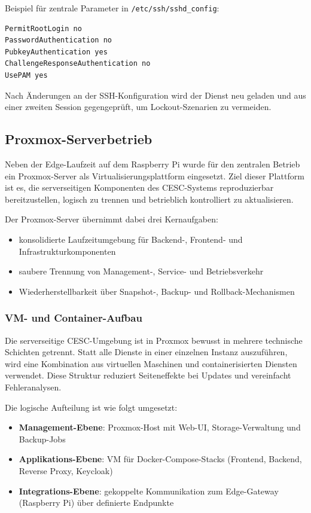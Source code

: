Beispiel für zentrale Parameter in \texttt{/etc/ssh/sshd\_config}:

\begin{lstlisting}[language=bash,caption={Typische SSH-Hardening-Parameter},label={lst:ssh_hardening},basicstyle=\ttfamily\small]
PermitRootLogin no
PasswordAuthentication no
PubkeyAuthentication yes
ChallengeResponseAuthentication no
UsePAM yes
\end{lstlisting}

Nach Änderungen an der SSH-Konfiguration wird der Dienst neu geladen und aus einer zweiten Session gegengeprüft, um Lockout-Szenarien zu vermeiden.

\subsection{Proxmox-Serverbetrieb}

Neben der Edge-Laufzeit auf dem Raspberry Pi wurde für den zentralen Betrieb ein Proxmox-Server als Virtualisierungsplattform eingesetzt. Ziel dieser Plattform ist es, die serverseitigen Komponenten des CESC-Systems reproduzierbar bereitzustellen, logisch zu trennen und betrieblich kontrolliert zu aktualisieren.

Der Proxmox-Server übernimmt dabei drei Kernaufgaben:

\begin{itemize}
    \item konsolidierte Laufzeitumgebung für Backend-, Frontend- und Infrastrukturkomponenten
    \item saubere Trennung von Management-, Service- und Betriebsverkehr
    \item Wiederherstellbarkeit über Snapshot-, Backup- und Rollback-Mechanismen
\end{itemize}

\subsubsection{VM- und Container-Aufbau}

Die serverseitige CESC-Umgebung ist in Proxmox bewusst in mehrere technische Schichten getrennt. Statt alle Dienste in einer einzelnen Instanz auszuführen, wird eine Kombination aus virtuellen Maschinen und containerisierten Diensten verwendet. Diese Struktur reduziert Seiteneffekte bei Updates und vereinfacht Fehleranalysen.

Die logische Aufteilung ist wie folgt umgesetzt:

\begin{itemize}
    \item \textbf{Management-Ebene}: Proxmox-Host mit Web-UI, Storage-Verwaltung und Backup-Jobs
    \item \textbf{Applikations-Ebene}: VM für Docker-Compose-Stacks (Frontend, Backend, Reverse Proxy, Keycloak)
    \item \textbf{Integrations-Ebene}: gekoppelte Kommunikation zum Edge-Gateway (Raspberry Pi) über definierte Endpunkte
\end{itemize}

